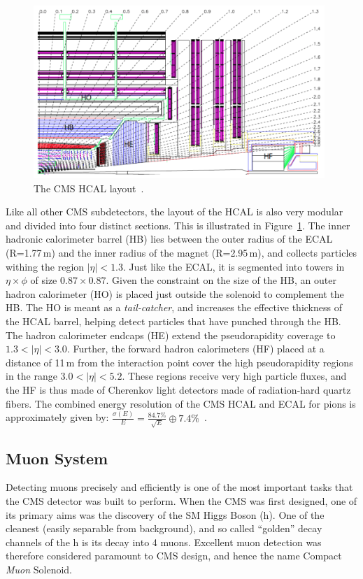 \begin{figure}
\begin{center}
  \includegraphics[width=0.98\textwidth,keepaspectratio]{plots_and_figures/chapter3/hcal_layout.png}
\caption{The CMS HCAL layout~\cite{cms_exp_ref}.}
\label{fig:hcal_layout}
\end{center}
\end{figure}

Like all other CMS subdetectors, the layout of the HCAL is also very modular and divided into four distinct sections. This is illustrated in Figure~\ref{fig:hcal_layout}. The inner hadronic calorimeter barrel (HB) lies between the outer radius of the ECAL (R=1.77\,m) and the inner radius of the magnet (R=2.95\,m), and collects particles withing the region $|\eta|<1.3$. Just like the ECAL, it is segmented into towers in $\eta\times\phi$ of size $0.87\times0.87$. Given the constraint on the size of the HB, an outer hadron calorimeter (HO) is placed just outside the solenoid to complement the HB. The HO is meant as a \textit{tail-catcher}, and increases the effective thickness of the HCAL barrel, helping detect particles that have punched through the HB. The hadron calorimeter endcaps (HE) extend the pseudorapidity coverage to $1.3 < |\eta| < 3.0$.  Further, the forward hadron calorimeters (HF) placed at a distance of 11\,m from the interaction point cover the high pseudorapidity regions in the range $3.0 < |\eta| < 5.2$. These regions receive very high particle fluxes, and the HF is thus made of Cherenkov light detectors made of radiation-hard quartz fibers. The combined energy resolution of the CMS HCAL and ECAL for pions is approximately given by: $\frac{\sigma(E)}{E}= \frac{84.7\%}{\sqrt{E}}\oplus7.4\%$~\cite{hcal2}.


\subsection{Muon System}
\label{muon_system}
Detecting muons precisely and efficiently is one of the most important tasks that the CMS detector was built to perform. When the CMS was first designed, one of its primary aims was the discovery of the SM Higgs Boson (h). One of the cleanest (easily separable from background), and so called ``golden'' decay channels of the h is its decay into 4 muons. Excellent muon detection was therefore considered paramount to CMS design, and hence the name Compact \textit{Muon} Solenoid.

